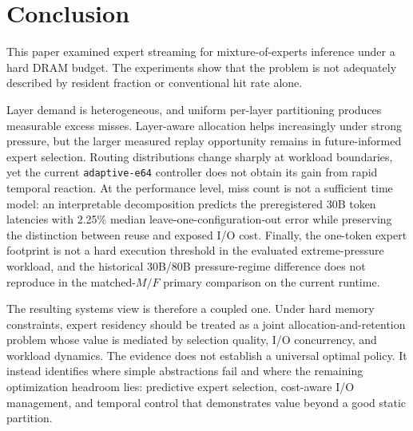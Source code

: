 \section{Conclusion}
\label{sec:conclusion}

This paper examined expert streaming for mixture-of-experts inference under a hard DRAM budget. The experiments show that the problem is not adequately described by resident fraction or conventional hit rate alone.

Layer demand is heterogeneous, and uniform per-layer partitioning produces measurable excess misses. Layer-aware allocation helps increasingly under strong pressure, but the larger measured replay opportunity remains in future-informed expert selection. Routing distributions change sharply at workload boundaries, yet the current \texttt{adaptive-e64} controller does not obtain its gain from rapid temporal reaction. At the performance level, miss count is not a sufficient time model: an interpretable decomposition predicts the preregistered 30B token latencies with 2.25\% median leave-one-configuration-out error while preserving the distinction between reuse and exposed I/O cost. Finally, the one-token expert footprint is not a hard execution threshold in the evaluated extreme-pressure workload, and the historical 30B/80B pressure-regime difference does not reproduce in the matched-$M/F$ primary comparison on the current runtime.

The resulting systems view is therefore a coupled one. Under hard memory constraints, expert residency should be treated as a joint allocation-and-retention problem whose value is mediated by selection quality, I/O concurrency, and workload dynamics. The evidence does not establish a universal optimal policy. It instead identifies where simple abstractions fail and where the remaining optimization headroom lies: predictive expert selection, cost-aware I/O management, and temporal control that demonstrates value beyond a good static partition.
